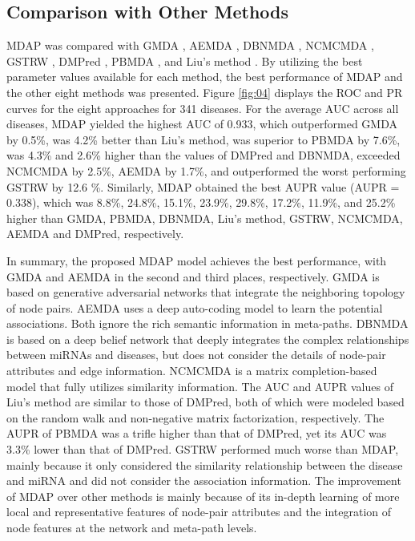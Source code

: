 \documentclass[journal,twoside,web]{ieeecolor}
\begin{document}
\subsection{Comparison with Other Methods}
MDAP was compared with GMDA \cite{0Integration}, AEMDA \cite{0AEMDA}, DBNMDA \cite{34}, NCMCMDA \cite{2020NCMCMDA}, GSTRW \cite{2018Global}, DMPred \cite{20}, PBMDA \cite{2017PBMDA}, and Liu’s method \cite{2016Inferring}. By utilizing the best parameter values available for each method, the best performance of MDAP and the other eight methods was presented. Figure \ref{fig:04} displays the ROC and PR curves for the eight approaches for 341 diseases. For the average AUC across all diseases, MDAP yielded the highest AUC of 0.933, which outperformed GMDA by 0.5\%, was 4.2\% better than Liu's method, was superior to PBMDA by 7.6\%, was 4.3\% and 2.6\% higher than the values of DMPred and DBNMDA, exceeded NCMCMDA by 2.5\%, AEMDA by 1.7\%, and outperformed the worst performing GSTRW by 12.6 \%. Similarly, MDAP obtained the best AUPR value (AUPR = 0.338), which was 8.8\%, 24.8\%, 15.1\%, 23.9\%, 29.8\%, 17.2\%, 11.9\%, and 25.2\% higher than GMDA, PBMDA, DBNMDA, Liu's method, GSTRW, NCMCMDA, AEMDA and DMPred, respectively.

In summary, the proposed MDAP model achieves the best performance, with GMDA and AEMDA in the second and third places, respectively. GMDA is based on generative adversarial networks that integrate the neighboring topology of node pairs. AEMDA uses a deep auto-coding model to learn the potential associations. Both ignore the rich semantic information in meta-paths. DBNMDA is based on a deep belief network that deeply integrates the complex relationships between miRNAs and diseases, but does not consider the details of node-pair attributes and edge information. NCMCMDA is a matrix completion-based model that fully utilizes similarity information. The AUC and AUPR values of Liu’s method are similar to those of DMPred, both of which were modeled based on the random walk and non-negative matrix factorization, respectively. The AUPR of PBMDA was a trifle higher than that of DMPred, yet its AUC was 3.3\% lower than that of DMPred. GSTRW performed much worse than MDAP, mainly because it only considered the similarity relationship between the disease and miRNA and did not consider the association information. The improvement of MDAP over other methods is mainly because of its in-depth learning of more local and representative features of node-pair attributes and the integration of node features at the network and meta-path levels.
\end{document}
